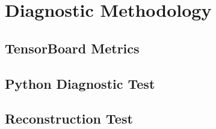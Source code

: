 \section{Diagnostic Methodology}
\label{sec:method_diagnostics}

\subsection{TensorBoard Metrics}

\subsection{Python Diagnostic Test}
%
%

\subsection{Reconstruction Test}
